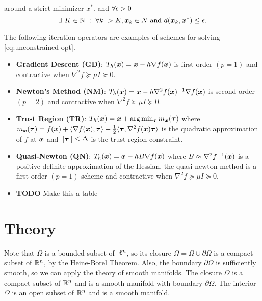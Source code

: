 \documentclass[10pt]{article}
\begin{document}
{\begin{definition}
\begin{enumerate}
                around a strict minimizer $x^*$. and $\forall \epsilon > 0$ 
                $$
                    \exists~ K \in \mathbb{N} ~:~ \forall k ~ > K, \bm{x}_k \in N \text{ and } 
                    d(\bm{x}_k, \bm{x}^*) \leq \epsilon.
                $$
            \end{enumerate}
        \end{definition}
        The following iteration operators are examples of schemes for solving
        \eqref{eq:unconstrained-opt}.
        \begin{itemize}
            \item \textbf{Gradient Descent (GD)}: $T_h(\bm{x}) = \bm{x} - h \nabla f(\bm{x})$
            is first-order $(p = 1)$ and contractive when $\nabla^2 f \succeq \mu I \succeq 0$.
            \item \textbf{Newton's Method (NM)}: $T_h(\bm{x}) = \bm{x} - h \nabla^2 f(\bm{x})^{-1} \nabla f(\bm{x})$
            is second-order $(p = 2)$ and contractive when $\nabla^2 f \succeq \mu I \succeq 0$.
            \item \textbf{Trust Region (TR)}: $T_h(\bm{x}) = \bm{x} + \arg \min_{\bm{\tau}} m_{\bm{x}}(\bm{\tau})$
            where $m_{\bm{x}}(\bm{\tau}) = f(\bm{x}) + \langle \nabla f(\bm{x}), \bm{\tau} \rangle +
            \frac{1}{2} \langle \bm{\tau}, \nabla^2 f(\bm{x}) \bm{\tau} \rangle$ is the quadratic approximation
            of $f$ at $\bm{x}$ and $\|\bm{\tau}\| \leq \Delta$ is the trust region constraint.
            \item \textbf{Quasi-Newton (QN)}: $T_h(\bm{x}) = \bm{x} - h B \nabla f(\bm{x})$ where
            $B \approx \nabla^2 f^{-1}(\bm{x})$ is a positive-definite approximation of the Hessian.
            the quasi-newton method is a first-order $(p = 1)$ scheme and contractive when
            $\nabla^2 f \succeq \mu I \succeq 0$.
            \item \textbf{TODO} Make this a table
        \end{itemize}
    }

    \medskip

    \section{Theory}
    
    Note that $\Omega$ is a bounded subset of $\mathbb{R}^n$, so its closure
    $\overline{\Omega} = \Omega \cup \partial \Omega$ is a compact subset
    of $\mathbb{R}^n$, by the Heine-Borel Theorem.
    Also, the boundary $\partial \Omega$ is sufficiently smooth,
    so we can apply the theory of smooth manifolds.
    The closure $\overline{\Omega}$ is a compact subset of $\mathbb{R}^n$ and
    is a smooth manifold with boundary $\partial \Omega$.
    The interior $\Omega$ is an open subset of $\mathbb{R}^n$ and is a smooth manifold.
\end{document}
